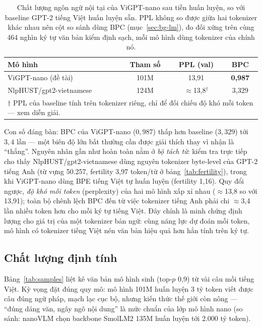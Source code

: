 \begin{table}[H]
	\centering
	\caption{Chất lượng ngôn ngữ nội tại của ViGPT-nano sau tiền huấn luyện,
	so với baseline GPT-2 tiếng Việt huấn luyện sẵn. PPL không so được giữa hai
	tokenizer khác nhau nên cột so sánh dùng BPC (mục~\ref{sec:bg-lm}), đo đối
	xứng trên cùng 464 nghìn ký tự văn bản kiểm định sạch, mỗi mô hình dùng
	tokenizer của chính nó.}
	\label{tab:ppl-bpc}
	\begin{tabular}{lccc}
		\hline
		\textbf{Mô hình} & \textbf{Tham số} & \textbf{PPL (val)} & \textbf{BPC} \\
		\hline
		ViGPT-nano (đề tài) & 101M & 13,91 & \textbf{0,987} \\
		NlpHUST/gpt2-vietnamese \autocite{nlphust2021gpt2vi} & 124M & $\approx$13,8$^\dagger$ & 3,329 \\
		\hline
		\multicolumn{4}{l}{\footnotesize $\dagger$ PPL của baseline tính trên
		tokenizer riêng, chỉ để đối chiếu độ khó mỗi token --- xem diễn giải.} \\
	\end{tabular}
\end{table}

Con số đáng bàn: BPC của ViGPT-nano ($0{,}987$) thấp hơn baseline ($3{,}329$)
tới $3{,}4$ lần --- một biên độ lớn bất thường cần được giải thích thay vì
nhận là ``thắng''. Nguyên nhân gần như hoàn toàn nằm ở \emph{bộ tách từ}:
kiểm tra trực tiếp cho thấy NlpHUST/gpt2-vietnamese dùng nguyên tokenizer
byte-level của GPT-2 tiếng Anh (từ vựng 50.257, fertility 3,97 token/từ ở
bảng~\ref{tab:fertility}), trong khi ViGPT-nano dùng BPE tiếng Việt tự huấn
luyện (fertility 1,16). Quy đổi ngược, \emph{độ khó mỗi token} (perplexity)
của hai mô hình xấp xỉ nhau ($\approx$13,8 so với 13,91); toàn bộ chênh lệch
BPC đến từ việc tokenizer tiếng Anh phải chi $\approx$3,4 lần nhiều token hơn
cho mỗi ký tự tiếng Việt. Đây chính là minh chứng định lượng cho giá trị của
một tokenizer bản ngữ: cùng năng lực dự đoán mỗi token, mô hình có tokenizer
tiếng Việt nén văn bản hiệu quả hơn hẳn tính trên ký tự.

\subsection{Chất lượng định tính}

Bảng~\ref{tab:samples} liệt kê văn bản mô hình sinh (top-$p$ 0,9) từ vài câu
mồi tiếng Việt. Kỳ vọng đặt đúng quy mô: mô hình 101M huấn luyện 3 tỷ token
viết được câu đúng ngữ pháp, mạch lạc cục bộ, nhưng kiến thức thế giới còn
nông --- ``đúng dáng văn, ngây ngô nội dung'' là mức chuẩn của lớp mô hình
nano (so sánh: nanoVLM \autocite{wiedmann2025nanovlm} chọn backbone SmolLM2
135M huấn luyện tới 2.000 tỷ token).

